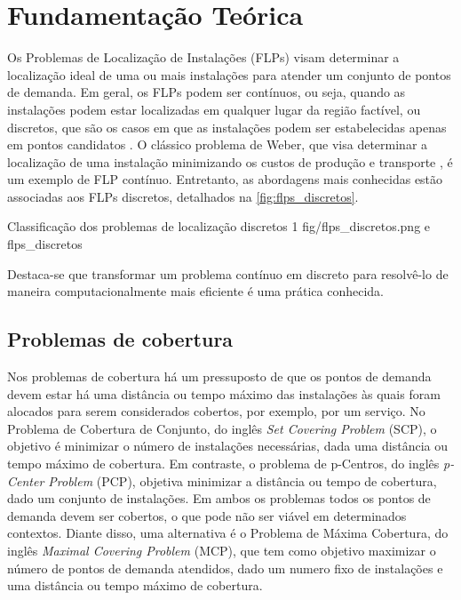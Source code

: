 \chapter{Fundamentação Teórica}

Os Problemas de Localização de Instalações (FLPs) visam determinar a localização ideal de uma ou mais instalações para atender um conjunto de pontos de demanda. Em geral, os FLPs podem ser contínuos, ou seja, quando as instalações podem estar localizadas em qualquer lugar da região factível, ou discretos, que são os casos em que as instalações podem ser estabelecidas apenas em pontos candidatos \cite{Eiselt2011, AhmadiJavid2017}. O clássico problema de Weber, que visa determinar a localização de uma instalação minimizando os custos de produção e transporte \cite{Weber1909}, é um exemplo de FLP contínuo. Entretanto, as abordagens mais conhecidas estão associadas aos FLPs discretos, detalhados na \autoref{fig:flps_discretos}.

\figura
{Classificação dos problemas de localização discretos}
{1}
{fig/flps_discretos.png}
{\textcite{Daskin2008} e \textcite{AhmadiJavid2017}}
{flps_discretos}
{}
{}

Destaca-se que transformar um problema contínuo em discreto para resolvê-lo de maneira computacionalmente mais eficiente é uma prática conhecida.

\section{Problemas de cobertura}

Nos problemas de cobertura há um pressuposto de que os pontos de demanda devem estar há uma distância ou tempo máximo das instalações às quais foram alocados para serem considerados cobertos, por exemplo, por um serviço. No Problema de Cobertura de Conjunto, do inglês \textit{Set Covering Problem} (SCP), o objetivo é minimizar o número de instalações necessárias, dada uma distância ou tempo máximo de cobertura. Em contraste, o problema de p-Centros, do inglês \textit{p-Center Problem} (PCP), objetiva minimizar a distância ou tempo de cobertura, dado um conjunto de instalações. Em ambos os problemas todos os pontos de demanda devem ser cobertos, o que pode não ser viável em determinados contextos. Diante disso, uma alternativa é o Problema de Máxima Cobertura, do inglês \textit{Maximal Covering Problem} (MCP), que tem como objetivo maximizar o número de pontos de demanda atendidos, dado um numero fixo de instalações e uma distância ou tempo máximo de cobertura.

